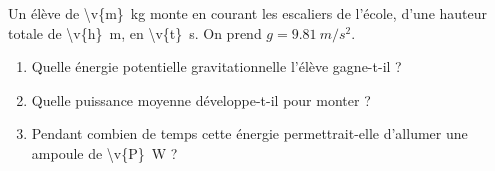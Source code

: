 Un élève de \qty{\v{m}}{kg} monte en courant les escaliers de l'école, d'une hauteur totale de \qty{\v{h}}{m}, en \qty{\v{t}}{s}. On prend $g = \qty{9.81}{m/s^2}$.

\begin{enumerate}[label=\alph*)]
    \item Quelle énergie potentielle gravitationnelle l'élève gagne-t-il ?
    \item Quelle puissance moyenne développe-t-il pour monter ?
    \item Pendant combien de temps cette énergie permettrait-elle d'allumer une ampoule de \qty{\v{P}}{W} ?
\end{enumerate}
